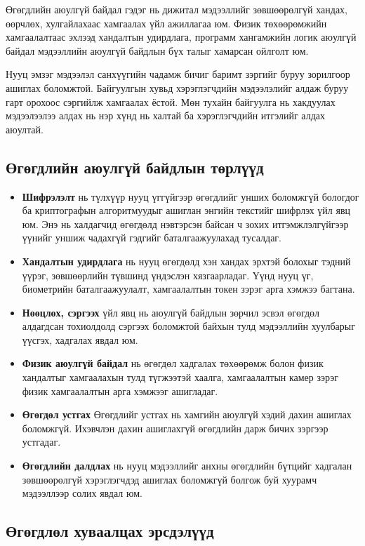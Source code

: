 Өгөгдлийн аюулгүй байдал гэдэг нь дижитал мэдээллийг зөвшөөрөлгүй хандах, өөрчлөх, хулгайлахаас хамгаалах үйл ажиллагаа юм. Физик төхөөрөмжийн хамгаалалтаас эхлээд хандалтын удирдлага, программ хангамжийн логик аюулгүй байдал мэдээллийн аюулгүй байдлын бүх талыг хамарсан ойлголт юм.

Нууц эмзэг мэдээлэл санхүүгийн чадамж бичиг баримт зэргийг буруу зорилгоор ашиглах боломжтой.
Байгуулгын хувьд хэрэглэгчдийн мэдээлэлийг алдаж буруу гарт орохоос сэргийлж хамгаалах ёстой. Мөн тухайн байгуулга нь хакдуулах мэдээлээлээ алдах нь нэр хүнд нь халтай ба хэрэглэгчдийн итгэлийг алдах аюултай.

\subsection{Өгөгдлийн аюулгүй байдлын төрлүүд}
\begin{itemize}
    \item \textbf{Шифрэлэлт} нь түлхүүр нууц үггүйгээр өгөгдлийг унших боломжгүй бологдог ба криптографын алгоритмуудыг ашиглан энгийн текстийг шифрлэх үйл явц юм. Энэ нь халдагчид өгөгдөлд нэвтэрсэн байсан ч зохих итгэмжлэлгүйгээр үүнийг уншиж чадахгүй гэдгийг баталгаажуулахад тусалдаг.
    \item \textbf{Хандалтын удирдлага} нь нууц өгөгдөлд хэн хандах эрхтэй болохыг тэдний үүрэг, зөвшөөрлийн түвшинд үндэслэн хязгаарладаг. Үүнд нууц үг, биометрийн баталгаажуулалт, хамгаалалтын токен зэрэг арга хэмжээ багтана.
    \item \textbf{Нөөцлөх, сэргээх} үйл явц нь аюулгүй байдлын зөрчил эсвэл өгөгдөл алдагдсан тохиолдолд сэргээх боломжтой байхын тулд мэдээллийн хуулбарыг үүсгэх, хадгалах явдал юм.
    \item \textbf{Физик аюулгүй байдал} нь өгөгдөл хадгалах төхөөрөмж болон физик хандалтыг хамгаалахын тулд түгжээтэй хаалга, хамгаалалтын камер зэрэг физик хамгаалалтын арга хэмжээг ашигладаг.
    \item \textbf{Өгөгдөл устгах} Өгөгдлийг устгах нь хамгийн аюулгүй хэдий дахин ашиглах боломжгүй. Ихэвчлэн дахин ашиглахгүй өгөгдлийн дарж бичих зэргээр устгадаг.
    \item \textbf{Өгөгдлийн далдлах} нь нууц мэдээллийг анхны өгөгдлийн бүтцийг хадгалан зөвшөөрөлгүй хэрэглэгчдэд ашиглах боломжгүй болгож буй хуурамч мэдээллээр солих явдал юм.
\end{itemize}

\subsection{Өгөгдлөл хуваалцах эрсдэлүүд}

